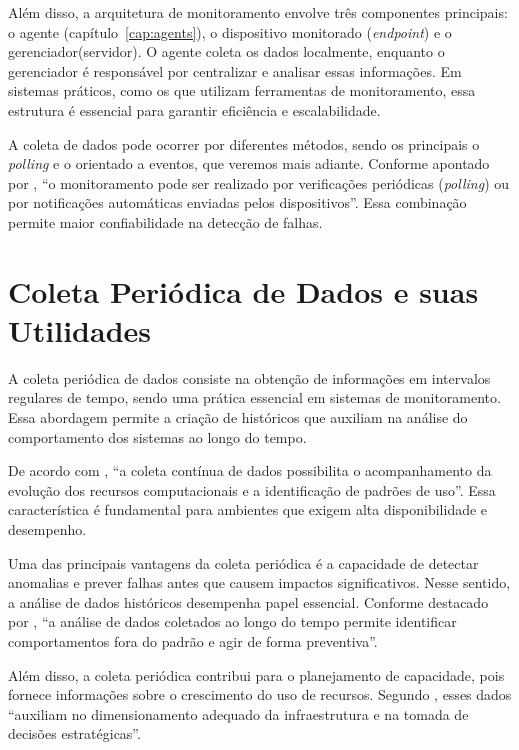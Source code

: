 \documentclass[
    12pt
    ,oneside
    ,a4paper
    ,chapter=TITLE
    ,section=TITLE
    ,sumario=abnt-6027-2012]{abntex2}
\begin{document}
Além disso, a arquitetura de monitoramento envolve três componentes principais: o agente (capítulo~\ref{cap:agents}), o dispositivo monitorado (\textit{endpoint}) e o gerenciador(servidor). O agente coleta os dados localmente, enquanto o gerenciador é responsável por centralizar e analisar essas informações. Em sistemas práticos, como os que utilizam ferramentas de monitoramento, essa estrutura é essencial para garantir eficiência e escalabilidade.

A coleta de dados pode ocorrer por diferentes métodos, sendo os principais o \textit{polling} e o orientado a eventos, que veremos mais adiante. Conforme apontado por , “o monitoramento pode ser realizado por verificações periódicas (\textit{polling}) ou por notificações automáticas enviadas pelos dispositivos”. Essa combinação permite maior confiabilidade na detecção de falhas.

\section{Coleta Periódica de Dados e suas Utilidades}

A coleta periódica de dados consiste na obtenção de informações em intervalos regulares de tempo, sendo uma prática essencial em sistemas de monitoramento. Essa abordagem permite a criação de históricos que auxiliam na análise do comportamento dos sistemas ao longo do tempo.

De acordo com , “a coleta contínua de dados possibilita o acompanhamento da evolução dos recursos computacionais e a identificação de padrões de uso”. Essa característica é fundamental para ambientes que exigem alta disponibilidade e desempenho.

Uma das principais vantagens da coleta periódica é a capacidade de detectar anomalias e prever falhas antes que causem impactos significativos. Nesse sentido, a análise de dados históricos desempenha papel essencial. Conforme destacado por , “a análise de dados coletados ao longo do tempo permite identificar comportamentos fora do padrão e agir de forma preventiva”.

Além disso, a coleta periódica contribui para o planejamento de capacidade, pois fornece informações sobre o crescimento do uso de recursos. Segundo , esses dados “auxiliam no dimensionamento adequado da infraestrutura e na tomada de decisões estratégicas”.
\end{document}
